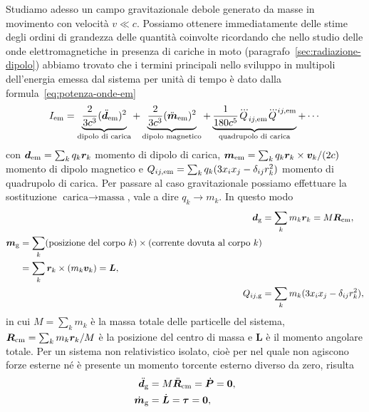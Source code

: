 Studiamo adesso un campo gravitazionale debole generato da masse in movimento
con velocità $v \ll c$.  Possiamo ottenere immediatamente delle stime degli
ordini di grandezza delle quantità coinvolte ricordando che nello studio delle
onde elettromagnetiche in presenza di cariche in moto
(paragrafo~\ref{sec:radiazione-dipolo}) abbiamo trovato che i termini principali
nello sviluppo in multipoli dell'energia emessa dal sistema per unità di tempo è
dato dalla formula~\eqref{eq:potenza-onde-em}
\begin{equation}
  I_{\textup{em}} = \underbrace{\frac{2}{3c^{3}}
    (\ddot{\bm{d}}_{\textup{em}})^{2}}_{\text{dipolo di carica}} +
  \underbrace{\frac{2}{3c^{3}} (\ddot{\bm{m}}_{\textup{em}})^{2}}_{\text{dipolo
      magnetico}} +
  \underbrace{\frac{1}{180c^{5}}
    \dddot{Q}_{ij,\textup{em}}\dddot{Q}^{ij,\textup{em}}}_{\text{quadrupolo di
      carica}} + \cdots
\end{equation}
con $\bm{d}_{\textup{em}} = \sum_{k} q_{k} \bm{r}_{k}$ momento di dipolo di
carica,
$\bm{m}_{\textup{em}} = \sum_{k} q_{k} \bm{r}_{k} \times \bm{v}_{k}/(2c)$
momento di dipolo magnetico e
$Q_{ij,\textup{em}} = \sum_{k} q_{k}(3x_{i}x_{j} -\delta_{ij}r_{k}^{2})$ momento
di quadrupolo di carica.  Per passare al caso gravitazionale possiamo effettuare
la sostituzione $\text{carica} \to \text{massa}$, vale a dire $q_{k} \to m_{k}$.
In questo modo
\begin{subequations}
  \begin{align}
    \bm{d}_{\textup{g}} &= \sum_{k} m_{k} \bm{r}_{k} = M \bm{R}_{\textup{cm}},\\
    \begin{split}
      \bm{m}_{\textup{g}} &= \sum_{k} (\text{posizione del corpo $k$}) \times
      (\text{corrente dovuta al corpo $k$}) \\
      &= \sum_{k} \bm{r}_{k} \times (m_{k} \bm{v}_{k}) = \bm{L},
    \end{split} \\
    Q_{ij,\textup{g}} &= \sum_{k} m_{k}(3x_{i}x_{j} -
    \delta_{ij}r_{k}^{2}),
  \end{align}
\end{subequations}
in cui $M = \sum_{k} m_{k}$ è la massa totale delle particelle del sistema,
$\bm{R}_{\textup{cm}} = \sum_{k} m_{k} \bm{r}_{k}/M$ è la posizione del centro
di massa e $\bm{L}$ è il momento angolare totale.  Per un sistema non
relativistico isolato, cioè per nel quale non agiscono forze esterne né è
presente un momento torcente esterno diverso da zero, risulta
\begin{subequations}
  \begin{align}
    \ddot{\bm{d}}_{\textup{g}} &= M \ddot{\bm{R}}_{\textup{cm}} =
    \dot{\bm{P}} = \bm{0}, \\
    \dot{\bm{m}}_{\textup{g}} &= \dot{\bm{L}} = \bm{\tau} = \bm{0},
  \end{align}
\end{subequations}
